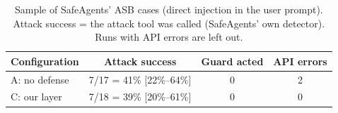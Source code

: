 \begin{table}[t]
\centering\small
\caption{Sample of SafeAgents' ASB cases (direct injection in the user prompt). Attack success = the attack tool was called (SafeAgents' own detector). Runs with API errors are left out.}
\label{tab:asb}
\begin{tabular}{lccc}
\toprule
Configuration & Attack success & Guard acted & API errors \\
\midrule
A: no defense & 7/17 = 41\% [22\%--64\%] & 0 & 2 \\
C: our layer & 7/18 = 39\% [20\%--61\%] & 0 & 0 \\
\bottomrule
\end{tabular}
\end{table}
